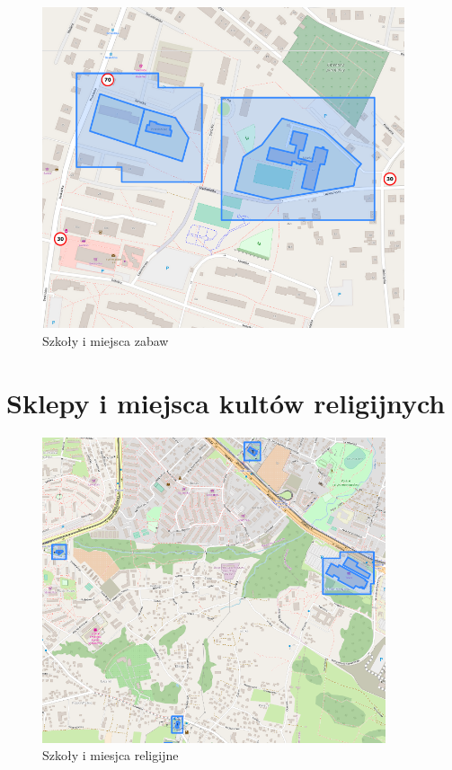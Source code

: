 \begin{figure}[h]
\caption{Szkoły i miejsca zabaw}
\label{sec:schoolsSpeed}
\centering
\includegraphics[width=0.95\textwidth]{schoolsSpeed}
\end{figure}

\newpage
\section{Sklepy i miejsca kultów religijnych}

\begin{figure}[h]
\caption{Szkoły i miesjca religijne}
\label{sec:shopsBorder}
\centering
\includegraphics[width=0.9\textwidth]{shopsBorder}
\end{figure}

